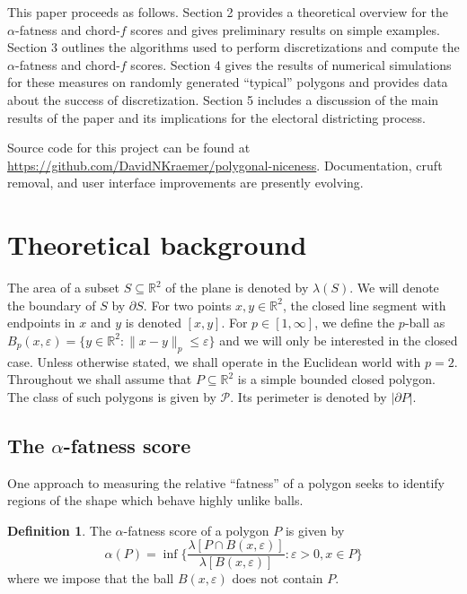 \documentclass[]{jocg}
\newcommand{\RR}{\mathbb{R}}
\newcommand{\PP}{\mathcal{P}}
\newcommand{\set}[1]{\{#1\}}
\newcommand{\norm}[1]{\|#1\|}
\newcommand{\abs}[1]{|#1|}
\theoremstyle{definition}
\newtheorem{definition}[proposition]{Definition}
\theoremstyle{remark}
\begin{document}
This paper proceeds as follows. Section 2 provides a theoretical overview for
the $\alpha$-fatness and chord-$f$ scores and gives preliminary results on
simple examples. Section 3 outlines the algorithms used to perform
discretizations and compute the $\alpha$-fatness and chord-$f$ scores. Section 4
gives the results of numerical simulations for these measures on randomly
generated ``typical'' polygons and provides data about the success of
discretization. Section 5 includes a discussion of the main results of the paper
and its implications for the electoral districting process.

Source code for this project can be found at
\url{https://github.com/DavidNKraemer/polygonal-niceness}. Documentation, cruft
removal, and user interface improvements are presently evolving.

\section{Theoretical background}

The area of a subset $S \subseteq \RR^2$ of the plane is denoted by
$\lambda(S)$. We will denote the boundary of $S$ by $\partial S$. For two points
$x,y \in \RR^2$, the closed line segment with endpoints in $x$ and $y$ is
denoted $[x,y]$. For $p \in [1, \infty]$, we define the $p$-ball as $B_{p}(x,
\varepsilon) = \set{y \in \RR^2 : \norm{x-y}_p \leq \varepsilon}$ and we will
only be interested in the closed case. Unless otherwise stated, we shall operate
in the Euclidean world with $p = 2$. Throughout we shall assume that $P
\subseteq \RR^2$ is a simple bounded closed polygon. The class of such polygons
is given by $\PP$. Its perimeter is denoted by $\abs{\partial P}$.

\subsection{The $\alpha$-fatness score}

One approach to measuring the relative ``fatness'' of a polygon seeks to
identify regions of the shape which behave highly unlike balls.

\begin{definition}
  The $\alpha$-fatness score of a polygon $P$ is given by
  \begin{equation*}
    \alpha(P) = \inf\set{\frac{\lambda[P \cap B(x,
    \varepsilon)]}{\lambda[B(x,\varepsilon)]} : \varepsilon > 0, x \in P}
  \end{equation*}
  where we impose that the ball $B(x,\varepsilon)$
  does not contain $P$. 
  \label{def:alpha}
\end{definition}
\end{document}
